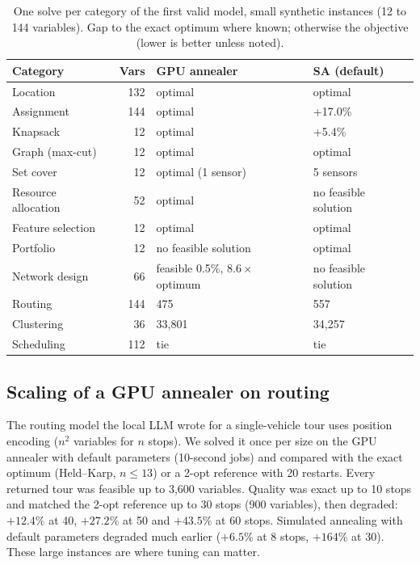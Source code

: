 \begin{table}[t]
\centering
\caption{One solve per category of the first valid model, small synthetic instances (12 to 144 variables).
Gap to the exact optimum where known; otherwise the objective (lower is better unless noted).}
\label{tab:suite}
\small
\begin{tabular}{@{}lrll@{}}
\toprule
Category & Vars & GPU annealer & SA (default) \\
\midrule
Location & 132 & optimal & optimal \\
Assignment & 144 & optimal & +17.0\% \\
Knapsack & 12 & optimal & +5.4\% \\
Graph (max-cut) & 12 & optimal & optimal \\
Set cover & 12 & optimal (1 sensor) & 5 sensors \\
Resource allocation & 52 & optimal & no feasible solution \\
Feature selection & 12 & optimal & optimal \\
Portfolio & 12 & no feasible solution & optimal \\
Network design & 66 & feasible 0.5\%, $8.6\times$ optimum & no feasible solution \\
Routing & 144 & 475 & 557 \\
Clustering & 36 & 33{,}801 & 34{,}257 \\
Scheduling & 112 & tie & tie \\
\bottomrule
\end{tabular}
\end{table}

\subsection{Scaling of a GPU annealer on routing}
The routing model the local LLM wrote for a single-vehicle tour uses position encoding ($n^2$ variables for $n$
stops). We solved it once per size on the GPU annealer with default parameters (10-second jobs) and compared with
the exact optimum (Held--Karp, $n\le 13$) or a 2-opt reference with 20 restarts. Every returned tour was feasible
up to 3{,}600 variables. Quality was exact up to 10 stops and matched the 2-opt reference up to 30 stops (900
variables), then degraded: $+12.4\%$ at 40, $+27.2\%$ at 50 and $+43.5\%$ at 60 stops. Simulated annealing with
default parameters degraded much earlier ($+6.5\%$ at 8 stops, $+164\%$ at 30). These large instances are where
tuning can matter. 

